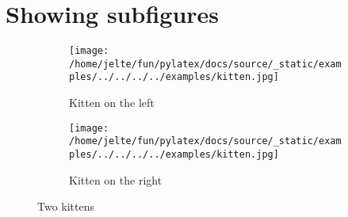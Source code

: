 \documentclass{article}%
\begin{document}
%
\normalsize%
\section{Showing subfigures}%
\label{sec:Showingsubfigures}%


\begin{figure}[h!]%
\begin{subfigure}[b]{0.45\linewidth}%
\texttt{[image: /home/jelte/fun/pylatex/docs/source/\_static/examples/../../../../examples/kitten.jpg]}%
\caption{Kitten on the left}%
\end{subfigure}%
\begin{subfigure}[b]{0.45\linewidth}%
\texttt{[image: /home/jelte/fun/pylatex/docs/source/\_static/examples/../../../../examples/kitten.jpg]}%
\caption{Kitten on the right}%
\end{subfigure}%
\caption{Two kittens}%
\end{figure}

%
\end{document}
